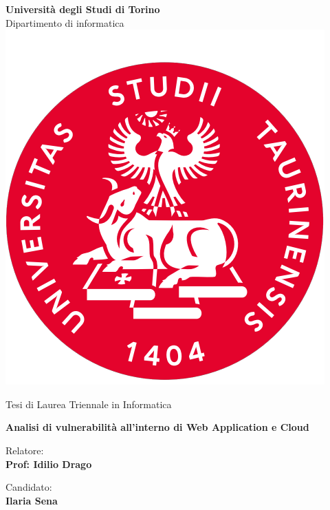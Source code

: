 \begin{titlepage}

\begin{center}
    \textbf{\huge{Università degli Studi di Torino}}
    \vspace{2mm}
    \\ \LARGE{Dipartimento di informatica}
    \vspace{5mm}
    \\ \includegraphics[keepaspectratio=true,scale=0.4]{images/unito_logo.png}
    \vspace{5mm}
\end{center}

\begin{center}
    \LARGE{Tesi di Laurea Triennale in Informatica} 
\end{center}

\vspace{15mm}
\begin{center}
    \linespread{1.5}%
    \selectfont
    \textbf{\huge{ Analisi di vulnerabilità all’interno di Web
    Application e Cloud }}
\end{center}
\vspace{30mm}

\begin{minipage}[t]{0.47\textwidth}
	{\large{Relatore:}{\normalsize\vspace{3mm}
	\bf\\ \large{Prof: Idilio Drago} \normalsize\vspace{3mm}\bf}}
\end{minipage}
\hfill
\begin{minipage}[t]{0.47\textwidth}\raggedleft
	{\large{Candidato:}{\normalsize\vspace{3mm} \bf\\ \large{Ilaria Sena}}}
\end{minipage}

\vspace{40 mm}
\hrulefill
\\ 

\end{titlepage}